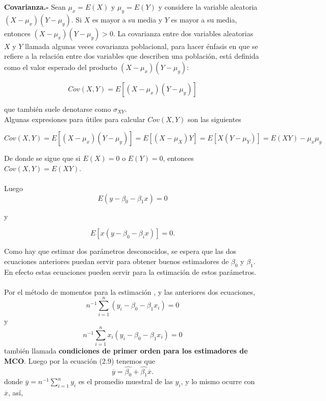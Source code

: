 \textbf{Covarianza.-} Sean $\mu_x = E(X)$ y $\mu_y = E(Y)$ y considere la variable aleatoria $(X-\mu_x)(Y-\mu_y)$. Si $X$ es mayor a su media y $Y$ es mayor a su media, entonces $(X-\mu_x)(Y-\mu_y)>0$. La covarianza entre dos variables aleatorias $X$ y $Y$ llamada algunas veces covarianza poblacional, para hacer énfasis en que se refiere a la relación entre dos variables que describen una población, está definida como el valor esperado del producto $(X-\mu_x)(Y-\mu_y)$: 

\begin{equation}
    Cov(X,Y) = E\left[(X-\mu_x)(Y-\mu_y)\right]
\end{equation}

que también suele denotarse como $\sigma_{XY}.$  \\
Algunas expresiones para útiles para calcular $Cov(X,Y)$ son las siguientes

\begin{equation}
    Cov(X,Y) = E\left[(X-\mu_x)(Y-\mu_y)\right] = E\left[(X-\mu_X)Y\right] = E\left[X(Y-\mu_Y)\right] = E(XY) - \mu_x \mu_y
\end{equation}

De donde se sigue que si $E(X)=0$ o $E(Y)=0$, entonces $Cov(X,Y) = E(XY)$.\\\\

Luego  
\begin{equation}
    E(y - \beta_0 - \beta_1x) = 0
\end{equation}
 
y 

\begin{equation}
    E\left[x(y - \beta_0 -\beta_i x )\right] = 0.
\end{equation}

Como hay que estimar dos parámetros desconocidos, se espera que las dos ecuaciones anteriores puedan servir para obtener buenos estimadores de $\beta_0$ y $\beta_1$. En efecto estas ecuaciones pueden servir para la estimación de estos parámetros.\\\\

Por el método de momentos para la estimación , y las anteriores dos ecuaciones,
\begin{equation}
    n^{-1} \sum\limits_{i=1}^n (y_i - \beta_0 - \beta_1x_i) = 0
\end{equation}
y 
\begin{equation}
    n^{-1} \sum\limits_{i=1}^n x_i(y_i - \beta_0 - \beta_1x_i) = 0
\end{equation}
también llamada \textbf{condiciones de primer orden para los estimadores de MCO}. Luego por la ecuación (2.9) tenemos que 
\begin{equation}
    \overline{y} = \hat{\beta_0} + \hat{\beta_1}\overline{x}.
\end{equation}
donde $\overline{y} = n^{-1}\sum\limits_{i=1}^n y_i$ es el promedio muestral de las $y_i$, y lo mismo ocurre con $\overline{x}$, así, 

